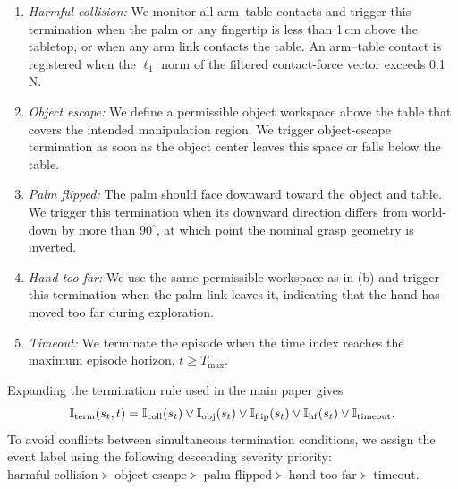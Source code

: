 \begin{enumerate}[label=(\alph*),leftmargin=2em,itemsep=2pt,topsep=3pt]
  \item \emph{Harmful collision:} We monitor all arm--table contacts and
  trigger this termination when the palm or any fingertip is less than
  1\,cm above the tabletop, or when any arm link contacts the table. An arm--table contact
  is registered when the $\ell_1$ norm of the filtered contact-force vector
  exceeds 0.1 N.
  \item \emph{Object escape:} We define a permissible object workspace above
  the table that covers the intended manipulation region.  We trigger
  object-escape termination as soon as the object center leaves this space or
  falls below the table.
  \item \emph{Palm flipped:} The palm should face downward toward the object and
  table.  We trigger this termination when its downward direction differs from
  world-down by more than $90^\circ$, at which point the nominal grasp geometry
  is inverted.
  \item \emph{Hand too far:} We use the same permissible workspace as in (b)
  and trigger this termination when the palm link leaves it, indicating that
  the hand has moved too far during exploration.
  \item \emph{Timeout:} We terminate the episode when the time index reaches
  the maximum episode horizon, $t\geq T_{\max}$.
\end{enumerate}
Expanding the termination rule used in the main paper gives
\[
\mathbb I_{\rm term}(s_t,t)
=\mathbb I_{\rm coll}(s_t)\lor\mathbb I_{\rm obj}(s_t)
 \lor\mathbb I_{\rm flip}(s_t)\lor\mathbb I_{\rm hf}(s_t)
 \lor\mathbb I_{\rm timeout}.
\]
To avoid conflicts between simultaneous termination conditions, we assign the
event label using the following descending severity priority:
$\text{harmful collision}\succ\text{object escape}\succ\text{palm flipped}
\succ\text{hand too far}\succ\text{timeout}$.

%
% 

